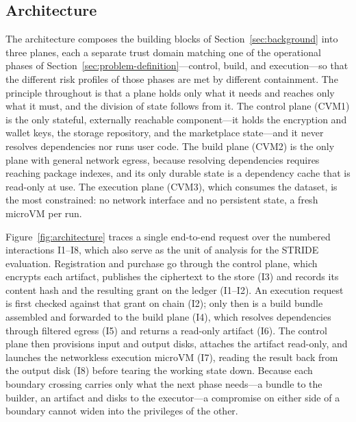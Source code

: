 \documentclass[runningheads]{llncs}
\begin{document}
\subsection{Architecture}
The architecture composes the building blocks of Section~\ref{sec:background} into three
planes, each a separate trust domain matching one of the operational phases of
Section~\ref{sec:problem-definition}---control, build, and execution---so that the different
risk profiles of those phases are met by different containment. The principle throughout is
that a plane holds only what it needs and reaches only what it must, and the division of
state follows from it. The control plane (CVM1) is the only stateful, externally reachable
component---it holds the encryption and wallet keys, the storage repository, and the
marketplace state---and it never resolves dependencies nor runs user code. The build plane
(CVM2) is the only plane with general network egress, because resolving dependencies
requires reaching package indexes, and its only durable state is a dependency cache that is
read-only at use. The execution plane (CVM3), which consumes the dataset, is the most
constrained: no network interface and no persistent state, a fresh microVM per run.

Figure~\ref{fig:architecture} traces a single end-to-end request over the numbered
interactions I1--I8, which also serve as the unit of analysis for the STRIDE evaluation.
Registration and purchase go through the control plane, which encrypts each artifact,
publishes the ciphertext to the store (I3) and records its content hash and the resulting
grant on the ledger (I1--I2). An execution request is first checked against that grant on
chain (I2); only then is a build bundle assembled and forwarded to the build plane (I4),
which resolves dependencies through filtered egress (I5) and returns a read-only artifact
(I6). The control plane then provisions input and output disks, attaches the artifact
read-only, and launches the networkless execution microVM (I7), reading the result back from
the output disk (I8) before tearing the working state down. Because each boundary crossing
carries only what the next phase needs---a bundle to the builder, an artifact and disks to
the executor---a compromise on either side of a boundary cannot widen into the privileges of
the other.
\end{document}
